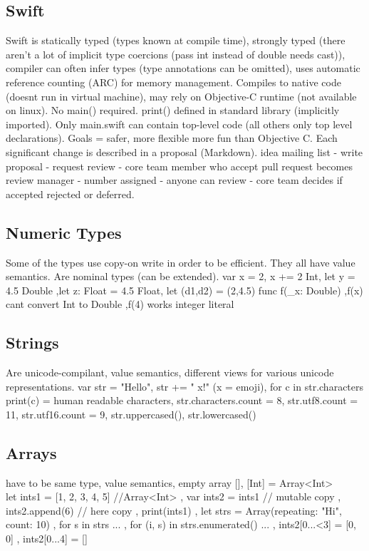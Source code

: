 \subsection{Swift}
Swift is statically typed (types known at compile time), strongly typed (there aren't a lot of implicit type coercions (pass int instead of double needs cast)), compiler can often infer types (type annotations can be omitted), uses automatic reference counting (ARC) for memory management. Compiles to native code (doesnt run in virtual machine), may rely on Objective-C runtime (not available on linux). No main() required. print() defined in standard library (implicitly imported). Only main.swift can contain top-level code (all others only top level declarations). Goals = safer, more flexible more fun than Objective C. Each significant change is described in a proposal (Markdown). idea mailing list - write proposal - request review - core team member who accept pull request becomes review manager - number assigned - anyone can review - core team decides if accepted rejected or deferred.

\subsection{Numeric Types}
Some of the types use copy-on write in order to be efficient. They all have value semantics. Are nominal types (can be extended).
var x = 2, x += 2 Int,
let y = 4.5 Double
,let z: Float = 4.5 Float,
let (d1,d2) = (2,4.5)
func f(\_x: Double) {}
,f(x) cant convert Int to Double
,f(4) works integer literal

\subsection{Strings}
Are unicode-compilant, value semantics, different views for various unicode representations.
var str = "Hello", str += " x!" (x = emoji),
for c in str.characters {print(c)} = human readable characters,
str.characters.count = 8,
str.utf8.count = 11,
str.utf16.count = 9,
str.uppercased(),
str.lowercased()

\subsection{Arrays}
have to be same type, value semantics, empty array [], [Int] = Array<Int>\\
let ints1 = [1, 2, 3, 4, 5] //Array<Int>
, var ints2 = ints1 // mutable copy
, ints2.append(6) // here copy
, print(ints1)
, let strs = Array(repeating: "Hi", count: 10)
, for s in strs { ... }
, for (i, s) in strs.enumerated() { ... }
, ints2[0...<3] = [0, 0]
, ints2[0...4] = []

